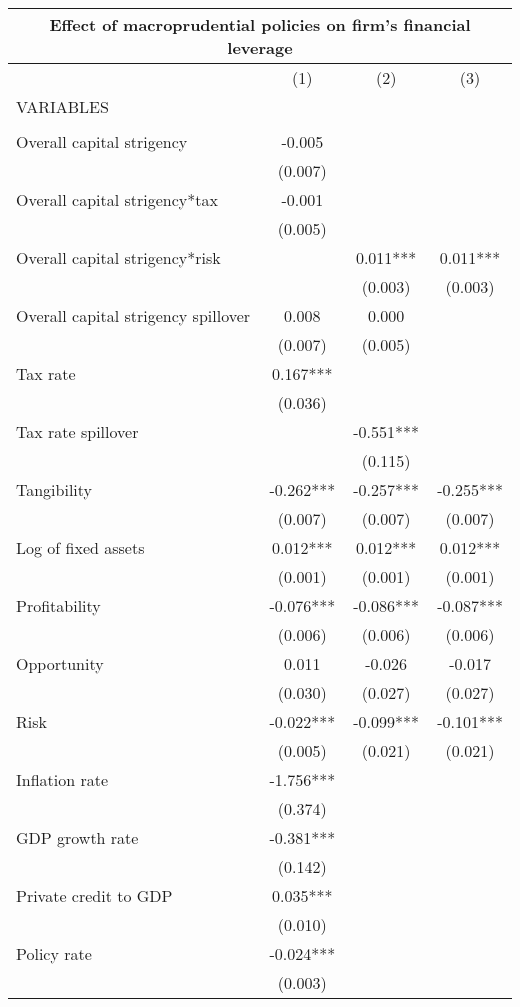 \begin{tabular}{lccc}
\multicolumn{4}{c}{Effect of macroprudential policies on firm's financial leverage} \\ \hline
 & (1) & (2) & (3) \\
VARIABLES &  &  &  \\ \hline
 &  &  &  \\
Overall capital strigency & -0.005 &  &  \\
 & (0.007) &  &  \\
Overall capital strigency*tax & -0.001 &  &  \\
 & (0.005) &  &  \\
Overall capital strigency*risk &  & 0.011*** & 0.011*** \\
 &  & (0.003) & (0.003) \\
Overall capital strigency spillover & 0.008 & 0.000 &  \\
 & (0.007) & (0.005) &  \\
Tax rate & 0.167*** &  &  \\
 & (0.036) &  &  \\
Tax rate spillover &  & -0.551*** &  \\
 &  & (0.115) &  \\
Tangibility & -0.262*** & -0.257*** & -0.255*** \\
 & (0.007) & (0.007) & (0.007) \\
Log of fixed assets & 0.012*** & 0.012*** & 0.012*** \\
 & (0.001) & (0.001) & (0.001) \\
Profitability & -0.076*** & -0.086*** & -0.087*** \\
 & (0.006) & (0.006) & (0.006) \\
Opportunity & 0.011 & -0.026 & -0.017 \\
 & (0.030) & (0.027) & (0.027) \\
Risk & -0.022*** & -0.099*** & -0.101*** \\
 & (0.005) & (0.021) & (0.021) \\
Inflation rate & -1.756*** &  &  \\
 & (0.374) &  &  \\
GDP growth rate & -0.381*** &  &  \\
 & (0.142) &  &  \\
Private credit to GDP & 0.035*** &  &  \\
 & (0.010) &  &  \\
Policy rate & -0.024*** &  &  \\
 & (0.003) &  &  \\

\end{tabular}
